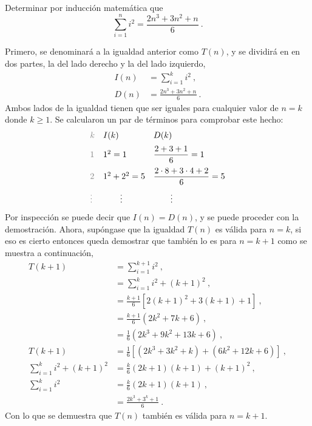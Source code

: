 Determinar por inducción matemática que
\begin{equation*}
    \sum_{i=1}^{n} i^2 = \frac{2 n^3 + 3 n^2 + n}{6}\ .
\end{equation*}
\begin{solution}
    Primero, se denominará a la igualdad anterior como $T(n)$, y se dividirá en en dos partes, la del lado derecho y la del lado izquierdo,
    \begin{equation*}
        \begin{split}
            I(n) & = \sum_{i=1}^{k} i^2\ ,\\
            D(n) & = \frac{2 n^3 + 3 n^2 + n}{6}\ .
        \end{split}
    \end{equation*}
    Ambos lados de la igualdad tienen que ser iguales para cualquier valor de $n = k$ donde $k \geq 1$. Se calcularon un par de términos para comprobar este hecho:
    \begin{equation*}
        \begin{array}{l l l}
            \txtgray{k} & I(k) & D(k) \medskip \\
            \txtgray{1} & 1^2 = 1 & \dfrac{2 + 3 + 1}{6} = 1 \medskip \\
            \txtgray{2} & 1^2 + 2^2 = 5 & \dfrac{\dprod{2}{8} + \dprod{3}{4} + 2}{6} = 5 \medskip \\
            \txtgray\vdots & \qquad\vdots & \qquad\vdots
        \end{array}
    \end{equation*}
    Por inspección se puede decir que $I(n) = D(n)$, y se puede proceder con la demostración. Ahora, supóngase que la igualdad $T(n)$ es válida para $n = k$, si eso es cierto entonces queda demostrar que también lo es para $n = k+1$ como se muestra a continuación,
    \begin{equation*}
        \begin{split}
            T(k+1) & = \sum_{i=1}^{k+1} i^2\ ,\\
            & = \sum_{i=1}^{k} i^2 + (k+1)^2\ ,\\
            & = \frac{k+1}{6} \left[2 (k + 1)^2 + 3 (k + 1) + 1\right]\ ,\\
            & = \frac{k+1}{6} \left(2 k^2 + 7 k + 6\right)\ ,\\
            & = \frac{1}{6} \left(2 k^3 + 9 k^2 + 13 k + 6\right)\ ,\\
            T(k + 1) & = \frac{1}{6} \left[\left(2 k^3 + 3 k^2 + k\right) + \left(6 k^2 + 12 k + 6\right)\right]\ ,\\
            \sum_{i=1}^{k} i^2 + (k+1)^2 & = \frac{k}{6} \left(2 k + 1\right) \left(k + 1\right) + \left(k + 1\right)^2\ ,\\
            \sum_{i=1}^{k} i^2 & = \frac{k}{6} \left(2 k + 1\right) \left(k + 1\right)\ ,\\
            & = \frac{2 k^3 + 3^k + 1}{6}\ .
        \end{split}
    \end{equation*}
    Con lo que se demuestra que $T(n)$ también es válida para $n = k+1$.
\end{solution}



